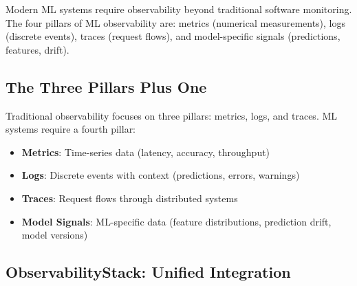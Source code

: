 Modern ML systems require observability beyond traditional software monitoring. The four pillars of ML observability are: metrics (numerical measurements), logs (discrete events), traces (request flows), and model-specific signals (predictions, features, drift).

\subsection{The Three Pillars Plus One}

Traditional observability focuses on three pillars: metrics, logs, and traces. ML systems require a fourth pillar:

\begin{itemize}
    \item \textbf{Metrics}: Time-series data (latency, accuracy, throughput)
    \item \textbf{Logs}: Discrete events with context (predictions, errors, warnings)
    \item \textbf{Traces}: Request flows through distributed systems
    \item \textbf{Model Signals}: ML-specific data (feature distributions, prediction drift, model versions)
\end{itemize}

\subsection{ObservabilityStack: Unified Integration}

